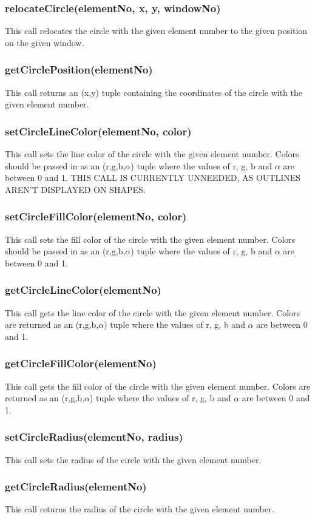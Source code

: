 \documentclass{acm_proc_article-sp}
\begin{document}
\subsubsection{relocateCircle(elementNo, x, y, windowNo)}
This call relocates the circle with the given element number to the given position on the given window.
\subsubsection{getCirclePosition(elementNo)}
This call returns an (x,y) tuple containing the coordinates of the circle with the given element number.
\subsubsection{setCircleLineColor(elementNo, color)}
This call sets the line color of the circle with the given element number. Colors should be passed in as an (r,g,b,$\alpha$) tuple where the values of r, g, b and $\alpha$ are between 0 and 1. THIS CALL IS CURRENTLY UNNEEDED, AS OUTLINES AREN'T DISPLAYED ON SHAPES.
\subsubsection{setCircleFillColor(elementNo, color)}
This call sets the fill color of the circle with the given element number. Colors should be passed in as an (r,g,b,$\alpha$) tuple where the values of r, g, b and $\alpha$ are between 0 and 1.
\subsubsection{getCircleLineColor(elementNo)}
This call gets the line color of the circle with the given element number. Colors are returned as an (r,g,b,$\alpha$) tuple where the values of r, g, b and $\alpha$ are between 0 and 1.
\subsubsection{getCircleFillColor(elementNo)}
This call gets the fill color of the circle with the given element number. Colors are returned as an (r,g,b,$\alpha$) tuple where the values of r, g, b and $\alpha$ are between 0 and 1.
\subsubsection{setCircleRadius(elementNo, radius)}
This call sets the radius of the circle with the given element number.
\subsubsection{getCircleRadius(elementNo)}
This call returns the radius of the circle with the given element number.
\end{document}
